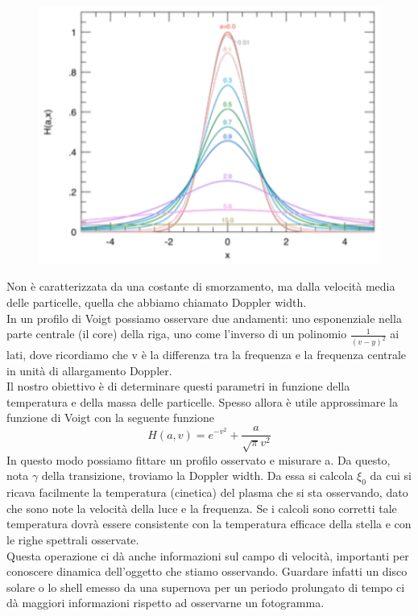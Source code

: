 \documentclass[a4paper,11pt]{article}
\begin{document}
\begin{figure}[h]
	\centering
	\includegraphics[width=0.5\linewidth]{voigtprofile}
	\caption{}
	\label{fig:voigtprofile}
\end{figure}
Non è caratterizzata da una costante di smorzamento, ma dalla velocità media delle particelle, quella che abbiamo chiamato Doppler width.\\
In un profilo di Voigt possiamo osservare due andamenti: uno esponenziale nella parte centrale (il core) della riga, uno come l’inverso di un polinomio \begin{math} \frac{1}{(v-y)^2} \end{math} ai lati, dove ricordiamo che v è la differenza tra la frequenza e la frequenza centrale in unità di allargamento Doppler.\\
Il nostro obiettivo è di determinare questi parametri in funzione della temperatura e della massa delle particelle. Spesso allora è utile approssimare la funzione di Voigt con la seguente funzione
$$
H(a,v)=e^{-v^2}+\frac{a}{\sqrt{\pi}v^2}
$$
In questo modo possiamo fittare un profilo osservato e misurare a. Da questo, nota \begin{math}\gamma\end{math} della transizione, troviamo la Doppler width. Da essa si calcola \begin{math} \xi_0 \end{math} da cui si ricava facilmente la temperatura (cinetica) del plasma che si sta osservando, dato che sono note la velocità della luce e la frequenza. Se i calcoli sono corretti tale temperatura dovrà essere consistente con la temperatura efficace della stella e con le righe spettrali osservate.\\
Questa operazione ci dà anche informazioni sul campo di velocità, importanti per conoscere dinamica dell’oggetto che stiamo osservando.  Guardare infatti un disco solare o lo shell emesso da una supernova per un periodo prolungato di tempo ci dà maggiori informazioni rispetto ad osservarne un fotogramma.\\
\end{document}
